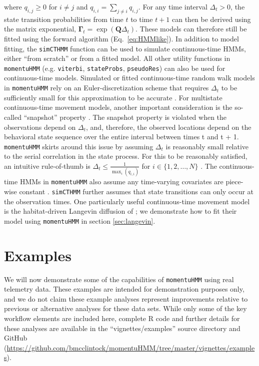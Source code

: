 \documentclass[12pt]{article}\usepackage[]{graphicx}\usepackage[]{xcolor}
\begin{document}
where $q_{i,j} \ge 0$ for $i \ne j$ and $q_{i,i}=\sum_{j \ne i} q_{i,j}$. For any time interval $\Delta_t>0$, the state transition probabilities from time $t$ to time $t+1$ can then be derived using the matrix exponential, $\boldsymbol{\Gamma}_t = \exp \left(\mathbf{Q} \Delta_t \right)$. These models can therefore still be fitted using the forward algorithm (Eq.\ \ref{eq:HMMlike}). In addition to model fitting, the \verb|simCTHMM| function can be used to simulate continuous-time HMMs, either ``from scratch'' or from a fitted model. All other utility functions in \verb|momentuHMM| (e.g. \verb|viterbi|, \verb|stateProbs|, \verb|pseudoRes|) can also be used for continuous-time models. Simulated or fitted continuous-time random walk models in \verb|momentuHMM| rely on an Euler-discretization scheme that requires $\Delta_t$ to be sufficiently small for this approximation to be accurate \citep[e.g.][]{MichelotEtAl2019}. For multistate continuous-time movement models, another important consideration is the so-called ``snapshot'' property \citep[e.g.][]{GlennieEtAl2021}. The snapshot property is violated when the observations depend on $\Delta_t$, and, therefore, the observed locations depend on the behavioral state sequence over the entire interval between times t and t + 1. \verb|momentuHMM| skirts around this issue by assuming $\Delta_t$ is reasonably small relative to the serial correlation in the state process. For this to be reasonably satisfied, an intuitive rule-of-thumb is $\Delta_t \le \frac{1}{\max_i\left(q_{i,i}\right)}$ for $i \in \{1,2,\ldots,N\}$ \citep{GlennieEtAl2021}. The continuous-time HMMs in \verb|momentuHMM| also assume any time-varying covariates are piece-wise constant \citep[e.g.][]{Jackson2011}. \verb|simCTHMM| further assumes that state transitions can only occur at the observation times. One particularly useful continuous-time movement model is the habitat-driven Langevin diffusion of \citet{MichelotEtAl2019}; we demonstrate how to fit their model using \verb|momentuHMM| in section \ref{sec:langevin}.
  
\section{Examples}
\label{sec:example}
We will now demonstrate some of the capabilities of \verb|momentuHMM| using real telemetry data. These examples are intended for demonstration purposes only, and we do not claim these example analyses represent improvements relative to previous or alternative analyses for these data sets. While only some of the key workflow elements are included here, complete R code and further details for these analyses are available in the ``vignettes/examples'' source directory and GitHub (\url{https://github.com/bmcclintock/momentuHMM/tree/master/vignettes/examples}).
\end{document}
